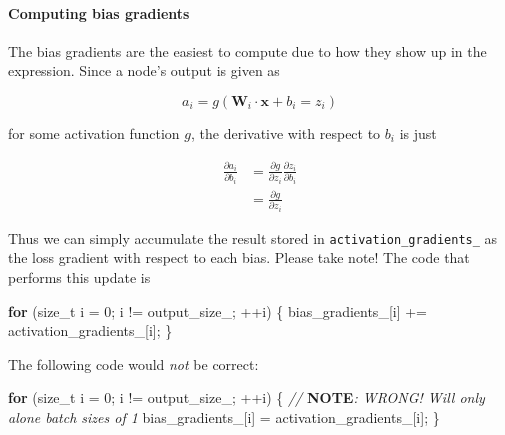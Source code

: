 \documentclass[
]{article}
\newenvironment{Shaded}{}{}
\newcommand{\AlertTok}[1]{\textcolor[rgb]{1.00,0.00,0.00}{\textbf{#1}}}
\newcommand{\CommentTok}[1]{\textcolor[rgb]{0.38,0.63,0.69}{\textit{#1}}}
\newcommand{\ControlFlowTok}[1]{\textcolor[rgb]{0.00,0.44,0.13}{\textbf{#1}}}
\newcommand{\DataTypeTok}[1]{\textcolor[rgb]{0.56,0.13,0.00}{#1}}
\newcommand{\DecValTok}[1]{\textcolor[rgb]{0.25,0.63,0.44}{#1}}
\newcommand{\NormalTok}[1]{#1}
\newcommand{\VariableTok}[1]{\textcolor[rgb]{0.10,0.09,0.49}{#1}}
\begin{document}
\hypertarget{computing-bias-gradients}{%
\paragraph{Computing bias gradients}\label{computing-bias-gradients}}

The bias gradients are the easiest to compute due to how they show up in
the expression. Since a node's output is given as

\[a_i = g\left(\mathbf{W}_i \cdot \mathbf{x} + b_i = z_i\right)\]

for some activation function \(g\), the derivative with respect to
\(b_i\) is just

\[
\begin{aligned}
\frac{\partial{a_i}}{\partial b_i} &= \frac{\partial g}{\partial z_i}\frac{\partial z_i}{\partial b_i} \\
&= \frac{\partial g}{\partial z_i}
\end{aligned}
\]

Thus we can simply accumulate the result stored in
\texttt{activation\_gradients\_} as the loss gradient with respect to
each bias. Please take note! The code that performs this update is

\begin{Shaded}
\begin{Highlighting}[]
    \ControlFlowTok{for}\NormalTok{ (}\DataTypeTok{size\_t}\NormalTok{ i = }\DecValTok{0}\NormalTok{; i != }\VariableTok{output\_size\_}\NormalTok{; ++i)}
\NormalTok{    \{}
        \VariableTok{bias\_gradients\_}\NormalTok{[i] += }\VariableTok{activation\_gradients\_}\NormalTok{[i];}
\NormalTok{    \}}
\end{Highlighting}
\end{Shaded}

The following code would \emph{not} be correct:

\begin{Shaded}
\begin{Highlighting}[]
    \ControlFlowTok{for}\NormalTok{ (}\DataTypeTok{size\_t}\NormalTok{ i = }\DecValTok{0}\NormalTok{; i != }\VariableTok{output\_size\_}\NormalTok{; ++i)}
\NormalTok{    \{}
        \CommentTok{// }\AlertTok{NOTE}\CommentTok{: WRONG! Will only alone batch sizes of 1}
        \VariableTok{bias\_gradients\_}\NormalTok{[i] = }\VariableTok{activation\_gradients\_}\NormalTok{[i];}
\NormalTok{    \}}
\end{Highlighting}
\end{Shaded}
\end{document}

